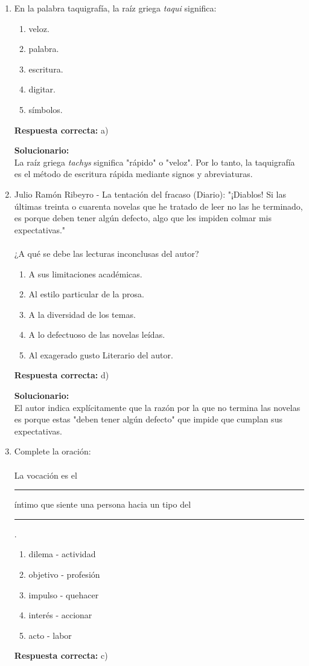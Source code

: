 \begin{enumerate}
	\item En la palabra taquigrafía, la raíz griega \textit{taqui} significa:
	\begin{enumerate}[label=\alph*)]
		\item veloz.
		\item palabra.
		\item escritura.
		\item digitar.
		\item símbolos.
	\end{enumerate}
	\textbf{Respuesta correcta:} a)
	
	\vspace{2mm}
	\textbf{Solucionario:}\\
	La raíz griega \textit{tachys} significa "rápido" o "veloz". Por lo tanto, la taquigrafía es el método de escritura rápida mediante signos y abreviaturas.
	
	\vspace{6mm}
	
	\item Julio Ramón Ribeyro - La tentación del fracaso (Diario): "¡Diablos! Si las últimas treinta o cuarenta novelas que he tratado de leer no las he terminado, es porque deben tener algún defecto, algo que les impiden colmar mis expectativas."\\
	\\
	¿A qué se debe las lecturas inconclusas del autor?
	\begin{enumerate}[label=\alph*)]
		\item A sus limitaciones académicas.
		\item Al estilo particular de la prosa.
		\item A la diversidad de los temas.
		\item A lo defectuoso de las novelas leídas.
		\item Al exagerado gusto Literario del autor.
	\end{enumerate}
	\textbf{Respuesta correcta:} d)
	
	\vspace{2mm}
	\textbf{Solucionario:}\\
	El autor indica explícitamente que la razón por la que no termina las novelas es porque estas "deben tener algún defecto" que impide que cumplan sus expectativas.
	
	\vspace{6mm}
	
	\item Complete la oración:\\
	\\
	La vocación es el \rule{2cm}{0.4pt} íntimo que siente una persona hacia un tipo del \rule{2cm}{0.4pt}.
	\begin{enumerate}[label=\alph*)]
		\item dilema - actividad
		\item objetivo - profesión
		\item impulso - quehacer
		\item interés - accionar
		\item acto - labor
	\end{enumerate}
	\textbf{Respuesta correcta:} c)
	

\end{enumerate}
